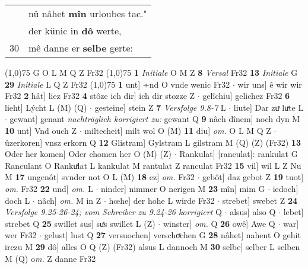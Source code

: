 \documentclass[8pt,a4paper,notitlepage]{article}
\begin{document}
\begin{table}[ht]
\begin{minipage}[t]{0.5\linewidth}
\begin{tabular}{rl}
 & nû nâhet \textbf{mîn} urloubes tac."\\ 
 & der künic in \textbf{dô} werte,\\ 
30 & mê danne er \textbf{selbe} gerte:\\ 
\end{tabular}
\scriptsize
\line(1,0){75} \newline
G O L M Q Z Fr32 \newline
\line(1,0){75} \newline
\textbf{1} \textit{Initiale} O M Z  \textbf{8} \textit{Versal} Fr32  \textbf{13} \textit{Initiale} G  \textbf{29} \textit{Initiale} L Q Z Fr32  \newline
\line(1,0){75} \newline
\textbf{1} unt] ÷nd O vnde wenic Fr32  $\cdot$ wir uns] ê wir wir Fr32 \textbf{2} hât] liez Fr32 \textbf{4} stôze ich dir] ich dir stozze Z  $\cdot$ gelîchiu] gelichez Fr32 \textbf{6} lieht] Lýcht L (M) (Q)  $\cdot$ gesteine] stein Z \textbf{7} \textit{Versfolge 9.8-7} L   $\cdot$ liute] Dar zuͯ luͯte L  $\cdot$ gewant] genant \textit{nachträglich korrigiert zu:} gewant Q \textbf{9} nâch dînem] noch dyn M \textbf{10} unt] Vnd ouch Z  $\cdot$ miltecheit] milt wol O (M) \textbf{11} diu] \textit{om.} O L M Q Z  $\cdot$ ûzerkoren] vnsz erkorn Q \textbf{12} Glistram] Gylstram L gilstram M (Q) (Z) (Fr32) \textbf{13} Oder her komen] Oder chomen her O (M) (Z)  $\cdot$ Rankulat] [ranculat]: rankulat G Ranculant O Rankuͯlat L kankulat M rantulat Z ranculat Fr32 \textbf{15} vil] wil L Z Nu M \textbf{17} ungenôt] svnder not O L (M) \textbf{18} ez] \textit{om.} Fr32  $\cdot$ gebôt] daz gebot Z \textbf{19} tuot] \textit{om.} Fr32 \textbf{22} und] \textit{om.} L  $\cdot$ ninder] nimmer O nerigen M \textbf{23} mîn] mim G  $\cdot$ iedoch] doch L  $\cdot$ nâch] \textit{om.} M in Z  $\cdot$ hœhe] der hohe L wirde Fr32  $\cdot$ strebet] swebet Z \textbf{24} \textit{Versfolge 9.25-26-24; vom Schreiber zu 9.24-26 korrigiert} Q   $\cdot$ alsus] also Q  $\cdot$ lebet] strebet Q \textbf{25} swillet sus] suͯs swillet L (Z)  $\cdot$ winster] \textit{om.} Q \textbf{26} owê] Awe Q  $\cdot$ war] wer Fr32  $\cdot$ gelust] lust Q \textbf{27} versuochen] verschoͮchen G \textbf{28} nâhet] nahent O gehit irczu M \textbf{29} dô] alles O Q (Z) (Fr32) alsus L dannoch M \textbf{30} selbe] selber L selben M (Q) o\textit{m. } Z danne Fr32 \newline
\end{minipage}
\hspace{0.5cm}
\begin{minipage}[t]{0.5\linewidth}

\end{minipage}
\end{table}
\end{document}
